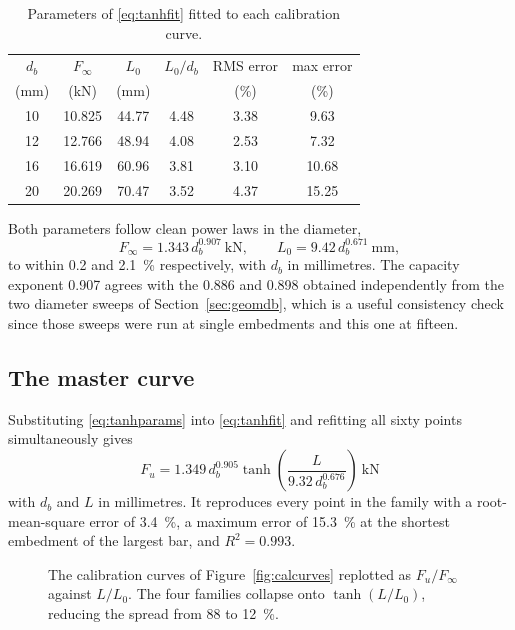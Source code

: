 \begin{table}[H]
\centering
\caption{Parameters of \eqref{eq:tanhfit} fitted to each calibration curve.}
\label{tab:tanhfit}
\small
\begin{tabular*}{\linewidth}{@{\extracolsep{\fill}}cccccc@{}}
\hline
$d_b$ & $F_\infty$ & $L_0$ & $L_0/d_b$ & RMS error & max error \\
(mm)  & (kN)       & (mm)  &           & (\%)      & (\%) \\
\hline
10 & 10.825 & 44.77 & 4.48 & 3.38 & 9.63 \\
12 & 12.766 & 48.94 & 4.08 & 2.53 & 7.32 \\
16 & 16.619 & 60.96 & 3.81 & 3.10 & 10.68 \\
20 & 20.269 & 70.47 & 3.52 & 4.37 & 15.25 \\
\hline
\end{tabular*}
\end{table}

Both parameters follow clean power laws in the diameter,
\begin{equation}
\label{eq:tanhparams}
F_\infty = 1.343\, d_b^{0.907}\ \si{\kilo\newton},
\qquad
L_0 = 9.42\, d_b^{0.671}\ \si{\milli\metre},
\end{equation}
to within \SI{0.2}{} and \SI{2.1}{\percent} respectively, with $d_b$ in
millimetres. The capacity exponent \num{0.907} agrees with the \num{0.886}
and \num{0.898} obtained independently from the two diameter sweeps of
Section~\ref{sec:geomdb}, which is a useful consistency check since those
sweeps were run at single embedments and this one at fifteen.

\subsection{The master curve}

Substituting \eqref{eq:tanhparams} into \eqref{eq:tanhfit} and refitting all
sixty points simultaneously gives
\begin{equation}
\label{eq:mastercurve}
\boxed{\;
F_u = 1.349\, d_b^{0.905}
      \tanh\!\left(\frac{L}{9.32\, d_b^{0.676}}\right)\ \si{\kilo\newton}
\;}
\end{equation}
with $d_b$ and $L$ in millimetres. It reproduces every point in the family
with a root-mean-square error of \SI{3.4}{\percent}, a maximum error of
\SI{15.3}{\percent} at the shortest embedment of the largest bar, and
$R^2 = 0.993$.

\begin{figure}[H]
\centering
\caption{The calibration curves of Figure~\ref{fig:calcurves} replotted as
         $F_u/F_\infty$ against $L/L_0$. The four families collapse onto
         $\tanh(L/L_0)$, reducing the spread from \SI{88}{} to
         \SI{12}{\percent}.}
\label{fig:mastercurve}
\end{figure}

